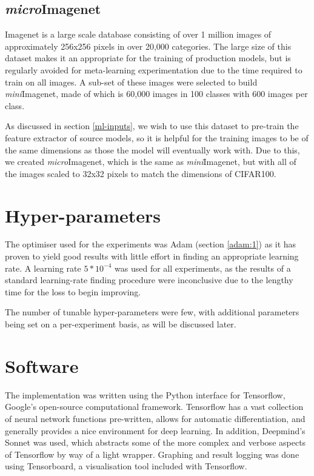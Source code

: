 \documentclass{report}
\begin{document}
\subsection{\textit{micro}Imagenet} \label{micro-imagenet}
Imagenet\parencite{ilsvr} is a large scale database consisting of over 1 million images of approximately 256x256 pixels in over 20,000 categories. The large size of this dataset makes it an appropriate for the training of production models, but is regularly avoided for meta-learning experimentation due to the time required to train on all images. A sub-set of these images were selected to build \textit{mini}Imagenet, made of which is 60,000 images in 100 classes with 600 images per class. \par
As discussed in section \ref{ml-inputs}, we wish to use this dataset to pre-train the feature extractor of source models, so it is helpful for the training images to be of the same dimensions as those the model will eventually work with. Due to this, we created \textit{micro}Imagenet, which is the same as \textit{mini}Imagenet, but with all of the images scaled to 32x32 pixels to match the dimensions of CIFAR100.

\section{Hyper-parameters}
The optimiser used for the experiments was Adam (section \ref{adam:1}) as it has proven to yield good results with little effort in finding an appropriate learning rate. A learning rate $5*10^{-4}$ was used for all experiments, as the results of a standard learning-rate finding procedure were inconclusive due to the lengthy time for the loss to begin improving. \par
The number of tunable hyper-parameters were few, with additional parameters being set on a per-experiment basis, as will be discussed later. \par

\section{Software}
The implementation was written using the Python interface for Tensorflow\parencite{tensorflow}, Google's open-source computational framework. Tensorflow has a vast collection of neural network functions pre-written, allows for automatic differentiation, and generally provides a nice environment for deep learning. In addition, Deepmind's Sonnet\parencite{sonnet} was used, which abstracts some of the more complex and verbose aspects of Tensorflow by way of a light wrapper. Graphing and result logging was done using Tensorboard, a visualisation tool included with Tensorflow. \par
\end{document}
